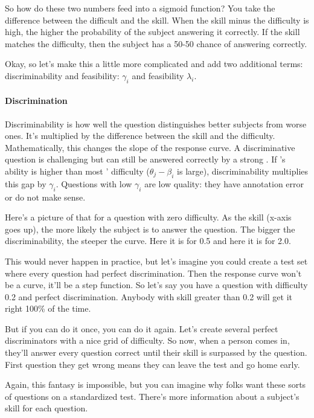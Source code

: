 So how do these two numbers feed into a sigmoid function?  You take the
difference between the difficult and the skill.  When the skill minus the
difficulty is high, the higher the probability of the subject answering it
correctly.  If the skill matches the difficulty, then the subject has a 50-50
chance of answering correctly.

Okay, so let’s make this a little more complicated and add two additional
terms: discriminability and feasibility: \discability{} $\gamma_i$ and
feasibility $\lambda_i$.

\paragraph{Discrimination}

Discriminability is how well the question distinguishes better subjects from
worse ones.  It’s multiplied by the difference between the skill and the
difficulty.  Mathematically, this changes the slope of the response curve.
%
A discriminative question is challenging but can still be answered
correctly by a strong \subj{}.
If \smart{}'s ability is higher than most \itms{}' difficulty
($\theta_j-\beta_i$ is large), \itm{} discriminability multiplies this
gap by $\gamma_i$.
Questions with low $\gamma_i$ are low quality: they have annotation
error or do not make sense.

Here’s a picture of that for a question with zero difficulty.  As the skill
(x-axis goes up), the more likely the subject is to answer the question.  The
bigger the discriminability, the steeper the curve.  Here it is for 0.5 and
here it is for 2.0.

This would never happen in practice, but let’s imagine you could create a test
set where every question had perfect discrimination.  Then the response curve
won’t be a curve, it’ll be a step function.  So let’s say you have a question
with difficulty 0.2 and perfect discrimination.  Anybody with skill greater
than 0.2 will get it right 100\% of the time.

But if you can do it once, you can do it again.  Let’s create several perfect
discriminators with a nice grid of difficulty.  So now, when a person comes
in, they’ll answer every question correct until their skill is surpassed by
the question.  First question they get wrong means they can leave the test and
go home early.

Again, this fantasy is impossible, but you can imagine why folks want these
sorts of questions on a standardized test.  There’s more information about a
subject’s skill for each question.

